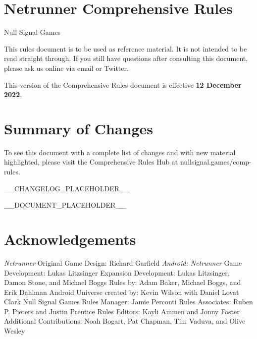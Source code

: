 \documentclass{article}
\newcommand{\subtitle}[1]{{\Large #1 \vspace{2ex}}}
\begin{document}

\section*{Netrunner Comprehensive Rules}
\subtitle{Null Signal Games}

\noindent
This rules document is to be used as reference material. It is not intended to be read straight through. If you still have questions after consulting this document, please ask us online via email or Twitter.

\noindent
This version of the Comprehensive Rules document is effective \textbf{12 December 2022}.

\section*{Summary of Changes}

\noindent
To see this document with a complete list of changes and with new material highlighted, please visit the Comprehensive Rules Hub at \textlangle{}nullsignal.games/comp-rules\textrangle.

__CHANGELOG_PLACEHOLDER__


\newpage


\begin{multicols}{2}
  \tableofcontents
\end{multicols}


\newpage


__DOCUMENT_PLACEHOLDER__


\newpage

\section*{Acknowledgements}

\begin{outline}[enumerate]
\1 \emph{Netrunner} Original Game Design: Richard Garfield
\1 \emph{Android: Netrunner}
  \2 Game Development: Lukas Litzsinger
  \2 Expansion Development: Lukas Litzsinger, Damon Stone, and Michael Boggs
  \2 Rules by: Adam Baker, Michael Boggs, and Erik Dahlman
  \2 Android Universe created by: Kevin Wilson with Daniel Lovat Clark
\1 Null Signal Games
  \2 Rules Manager: Jamie Perconti
  \2 Rules Associates: Ruben P. Pieters and Justin Prentice
  \2 Rules Editors: Kayli Ammen and Jonny Foster
  \2 Additional Contributions: Noah Bogart, Pat Chapman, Tim Vaduva, and Olive Wesley
\end{outline}
\end{document}
